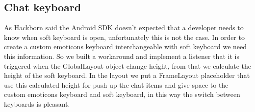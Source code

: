 \subsection{Chat keyboard}
As Hackborn said \cite{Dianne_Hackborn_keyboard} the Android SDK doesn't expected that a developer needs to know when soft keyboard is open, unfortunately this is not the case. In order to create a custom emoticons keyboard interchangeable with soft keyboard we need this information. So we built a workaround and implement a listener that it is triggered when the GlobalLayout object change height, from that we calculate the height of the soft keyboard. In the layout we put a FrameLayout placeholder that use this calculated height for push up the chat items and give space to the custom emoticons keyboard and soft keyboard, in this way the switch between keyboards is pleasant.

